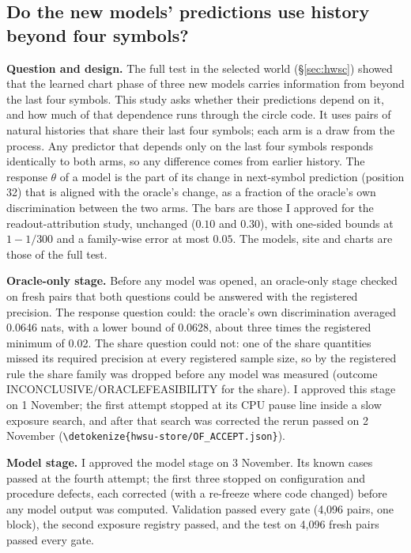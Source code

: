 \documentclass[11pt,a4paper]{article}
\DeclareRobustCommand{\_}{\ifmmode\origunderscore\else\textunderscore\allowbreak\fi}
\DeclareRobustCommand{\fpath}[1]{\begingroup\small\expandafter\nolinkurl\expandafter{\detokenize{#1}}\endgroup}
\begin{document}
\subsection{Do the new models' predictions use history beyond four symbols?}\label{sec:hwsu}
\textbf{Question and design.} The full test in the selected world (\S\ref{sec:hwsc}) showed that the
learned chart phase of three new models carries information from beyond the last four symbols.
This study asks whether their predictions depend on it, and how much of that dependence runs
through the circle code. It uses pairs of natural histories that share their last four symbols;
each arm is a draw from the process. Any predictor that depends only on the last four symbols
responds identically to both arms, so any difference comes from earlier history. The response
$\theta$ of a model is the part of its change in next-symbol prediction (position 32) that is
aligned with the oracle's change, as a fraction of the oracle's own discrimination between the two
arms. The bars are those I approved for the readout-attribution study, unchanged ($0.10$ and
$0.30$), with one-sided bounds at $1-1/300$ and a family-wise error at most $0.05$. The models,
site and charts are those of the full test.

\textbf{Oracle-only stage.} Before any model was opened, an oracle-only stage checked on fresh
pairs that both questions could be answered with the registered precision. The response
question could: the oracle's own discrimination averaged 0.0646 nats, with a lower bound of 0.0628,
about three times the registered minimum of 0.02. The share question could not: one of the share
quantities missed its required precision at every registered sample size, so by the registered
rule the share family was dropped before any model was measured (outcome
INCONCLUSIVE/ORACLE\_FEASIBILITY for the share). I approved this stage on 1 November; the first attempt stopped at
its CPU pause line inside a slow exposure search, and after that search was corrected the rerun
passed on 2 November
(\fpath{hwsu-store/OF_ACCEPT.json}).

\textbf{Model stage.} I approved the model stage on 3 November. Its known cases passed at the
fourth attempt; the first three stopped on configuration and procedure defects, each corrected
(with a re-freeze where code changed) before any model output was computed. Validation passed every
gate (4,096 pairs, one block), the second exposure registry passed, and the test on 4,096 fresh pairs
passed every gate.
\end{document}

